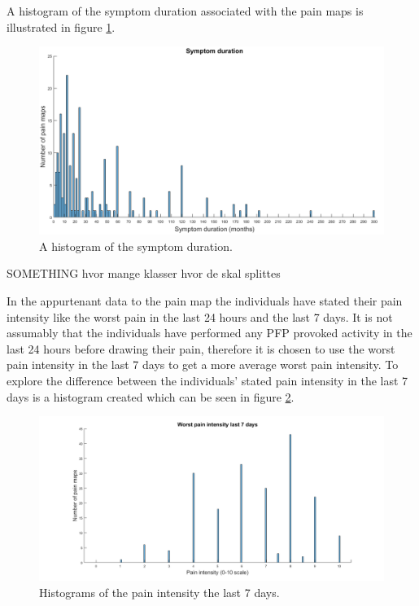\noindent
A histogram of the symptom duration associated with the pain maps is illustrated in figure \ref{fig:histoduration}.

\begin{figure} [H]
\centering
\includegraphics[width=1\textwidth]{figures/histogramDuration}
\caption{A histogram of the symptom duration.}
\label{fig:histoduration}
\end{figure}

\noindent
SOMETHING
hvor mange klasser
hvor de skal splittes 


In the appurtenant data to the pain map the individuals have stated their pain intensity like the worst pain in the last 24 hours and the last 7 days. 
It is not assumably that the individuals have performed any PFP provoked activity in the last 24 hours before drawing their pain, therefore it is chosen to use the worst pain intensity in the last 7 days to get a more average worst pain intensity. 
To explore the difference between the individuals’ stated pain intensity in the last 7 days is a histogram created which can be seen in figure \ref{fig:histopain}.

\begin{figure} [H]
\centering
\includegraphics[width=1\textwidth]{figures/histrogramPain}
\caption{Histograms of the pain intensity the last 7 days.}
\label{fig:histopain}
\end{figure}

